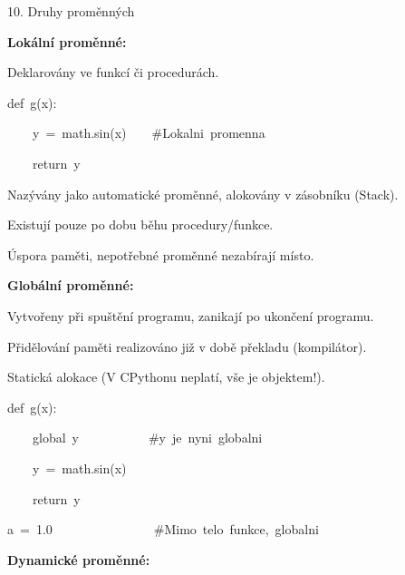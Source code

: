 \documentclass[czech]{beamer}
\newenvironment{lyxcode}
  {\par\begin{list}{}{
    \setlength{\rightmargin}{\leftmargin}
    \setlength{\listparindent}{0pt}%
    \raggedright
    \setlength{\itemsep}{0pt}
    \setlength{\parsep}{0pt}
    \normalfont\ttfamily}%
   \def\{{\char`\{}
   \def\}{\char`\}}
   \def\textasciitilde{\char`\~}
   \item[]}
  {\end{list}}
\begin{document}
\begin{frame}[plain]{10. Druhy proměnných}

{\tiny\textbf{Lokální proměnné:}}{\tiny\par}

{\tiny Deklarovány ve funkcí či procedurách. }{\tiny\par}
\begin{lyxcode}
{\tiny def~g(x):}{\tiny\par}

{\tiny ~~~~y~=~math.sin(x)~~~~\#Lokalni~promenna}{\tiny\par}

{\tiny ~~~~return~y}{\tiny\par}
\end{lyxcode}
{\tiny Nazývány jako automatické proměnné, alokovány v zásobníku (Stack).}{\tiny\par}

{\tiny Existují pouze po dobu běhu procedury/funkce. }{\tiny\par}

{\tiny Úspora paměti, nepotřebné proměnné nezabírají místo. }{\tiny\par}

{\tiny\medskip{}
}{\tiny\par}

{\tiny\textbf{Globální proměnné:}}{\tiny\par}

{\tiny Vytvořeny při spuštění programu, zanikají po ukončení programu.}{\tiny\par}

{\tiny Přidělování paměti realizováno již v době překladu (kompilátor).}{\tiny\par}

{\tiny Statická alokace (V CPythonu neplatí, vše je objektem!).}{\tiny\par}
\begin{lyxcode}
{\tiny def~g(x):}{\tiny\par}

{\tiny ~~~~global~y~~~~~~~~~~~\#y~je~nyni~globalni}{\tiny\par}

{\tiny ~~~~y~=~math.sin(x)~~~}{\tiny\par}

{\tiny ~~~~return~y}{\tiny\par}

{\tiny a~=~1.0~~~~~~~~~~~~~~~~\#Mimo~telo~funkce,~globalni}{\tiny\par}
\end{lyxcode}
{\tiny\textbf{Dynamické proměnné:}}{\tiny\par}


\end{frame}
\end{document}
